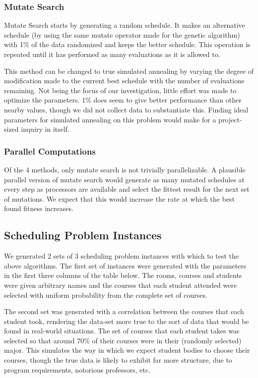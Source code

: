 \documentclass[letterpaper]{article}
\begin{document}
    \subsubsection{Mutate Search}
      Mutate Search starts by generating a random schedule. It makes an alternative schedule
      (by using the same mutate operator made for the genetic algorithm) with 1\% of the
      data randomized and keeps the better schedule. This operation is
      repeated until it has performed as many evaluations as it is allowed to.
      
      This method can be changed to true simulated annealing by varying the degree of
      modification made to the current best schedule with the number of evaluations
      remaining. Not being the focus of our investigation, little effort was made to 
      optimize the parameters. 1\% does seem to give better performance than other nearby 
      values, though we did not collect data to substantiate this. Finding ideal parameters 
      for simulated annealing on this problem would make for a project-sized inquiry in itself.
      
    \subsubsection{Parallel Computations}
      Of the 4 methods, only mutate search is not trivially parallelizable. A plausible 
      parallel version of mutate search would generate as many mutated schedules at 
      every step as processors are available and select the fittest result for the next 
      set of mutations. We expect that this would increase the rate at which the best 
      found fitness increases.
      
  \subsection{Scheduling Problem Instances}
    We generated 2 sets of 3 scheduling problem instances with which to test the 
    above algorithms. The first set of instances were generated with the parameters 
    in the first three columns of the table below. The rooms, courses and students 
    were given arbitrary names and the courses that each student attended were 
    selected with uniform probability from the complete set of courses.
      
    The second set was generated with a correlation between the courses that each 
    student took, rendering the data-set more true to the sort of data that would 
    be found in real-world situations. The set of courses that each student takes 
    was selected so that around 70\% of their courses were in their (randomly selected) 
    major. This simulates the way in which we expect student bodies to choose their 
    courses, though the true data is likely to exhibit far more structure, due to 
    program requirements, notorious professors, etc.
      
\end{document}

